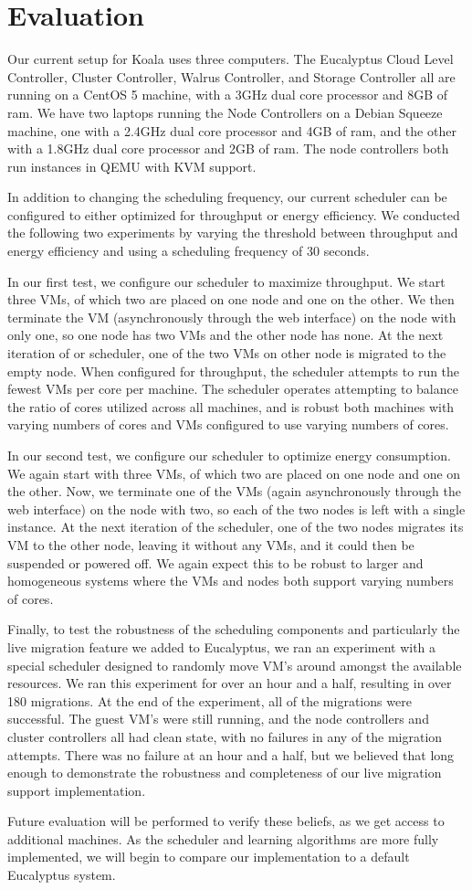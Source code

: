 \section{Evaluation}

Our current setup for Koala uses three computers.  The Eucalyptus Cloud Level Controller, Cluster Controller, Walrus Controller, and Storage Controller all are running on a CentOS 5 machine, with a 3GHz dual core processor and 8GB of ram.  We have two laptops running the Node Controllers on a Debian Squeeze machine, one with a 2.4GHz dual core processor and 4GB of ram, and the other with a 1.8GHz dual core processor and 2GB of ram.  The node controllers both run instances in QEMU with KVM support.  

In addition to changing the scheduling frequency, our current scheduler can be configured to either optimized for throughput or energy efficiency.  We conducted the following two experiments by varying the threshold between throughput and energy efficiency and using a scheduling frequency of 30 seconds.

In our first test, we configure our scheduler to maximize throughput.  We start three VMs, of which two are placed on one node and one on the other.  We then terminate the VM (asynchronously through the web interface) on the node with only one, so one node has two VMs and the other node has none.  At the next iteration of or scheduler, one of the two VMs on other node is migrated to the empty node.  When configured for throughput, the scheduler attempts to run the fewest VMs per core per machine.  The scheduler operates attempting to balance the ratio of cores utilized across all machines, and is robust both machines with varying numbers of cores and VMs configured to use varying numbers of cores.

In our second test, we configure our scheduler to optimize energy consumption.  We again start with three VMs, of which two are placed on one node and one on the other.  Now, we terminate one of the VMs (again asynchronously through the web interface) on the node with two, so each of the two nodes is left with a single instance.  At the next iteration of the scheduler, one of the two nodes migrates its VM to the other node, leaving it without any VMs, and it could then be suspended or powered off.  We again expect this to be robust to larger and homogeneous systems where the VMs and nodes both support varying numbers of cores.

Finally, to test the robustness of the scheduling components and particularly the live migration feature we added to Eucalyptus, we ran an experiment with a special scheduler designed to randomly move VM's around amongst the available resources.  We ran this experiment for over an hour and a half, resulting in over 180 migrations.  At the end of the experiment, all of the migrations were successful.  The guest VM's were still running, and the node controllers and cluster controllers all had clean state, with no failures in any of the migration attempts.  There was no failure at an hour and a half, but we believed that long enough to demonstrate the robustness and completeness of our live migration support implementation.

Future evaluation will be performed to verify these beliefs, as we get access to additional machines.  As the scheduler and learning algorithms are more fully implemented, we will begin to compare our implementation to a default Eucalyptus system.

